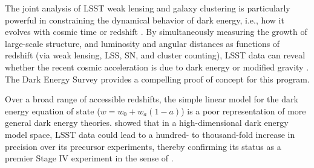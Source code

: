 The joint analysis of LSST weak lensing and galaxy clustering is
particularly powerful in constraining the dynamical behavior of dark
energy, i.e., how it evolves with cosmic time or redshift \citep{2004PhRvD..70D3009H,2006JCAP...08..008Z}.  By
simultaneously measuring the growth of large-scale structure, and
luminosity and angular distances as functions of redshift (via weak
lensing, LSS, SN, and cluster counting), LSST data can reveal whether
the recent cosmic acceleration is due to dark energy or modified
gravity \citep{2004PhRvD..69D4005L,2006PhRvD..74B3512K,2006PhRvD..74d3513I,2008PhRvD..78f3503J,2011PhRvD..83b3008O,2013ApJ...779...39J,2013PhR...530...87W}.
The Dark Energy Survey \citep[see e.g.,][and references therein]{2017arXiv170801530D} provides a compelling proof of concept for this program.

Over a broad range of accessible redshifts, the simple linear model
for the dark energy equation of state ($w = w_0 + w_a(1-a)$) is a poor representation of more
general dark energy theories. \citet{2008PhRvD..78d3528B} showed that in a high-dimensional dark energy model space,
LSST data could lead to a hundred- to thousand-fold increase in precision over its
precursor experiments, thereby confirming its status as
a premier Stage IV experiment in the sense of \citet{2006astro.ph..9591A}.

